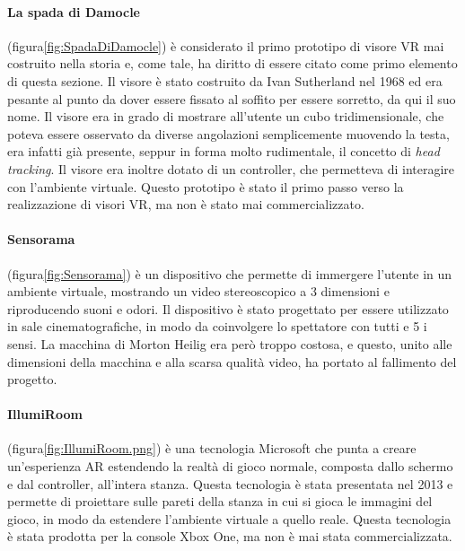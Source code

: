         \paragraph{La spada di Damocle} (figura\ref{fig:SpadaDiDamocle}) è considerato  il primo prototipo di visore VR mai costruito nella storia e, come tale, ha diritto di essere
            citato come primo elemento di questa sezione. Il visore è stato costruito da Ivan Sutherland nel 1968 ed era pesante al punto da dover essere fissato al soffito per
            essere sorretto, da qui il suo nome. Il visore era in grado di mostrare all'utente un cubo tridimensionale, che poteva essere osservato da diverse angolazioni 
            semplicemente muovendo la testa, era infatti già presente, seppur in forma molto rudimentale, il concetto di \textit{head tracking}. Il visore era inoltre dotato di un 
            controller, che permetteva di interagire con l'ambiente virtuale. Questo prototipo è stato il primo passo verso la realizzazione di visori VR, ma non è stato
            mai commercializzato.

        \paragraph{Sensorama} (figura\ref{fig:Sensorama}) è un dispositivo che permette di immergere l'utente in un
            ambiente virtuale, mostrando un video stereoscopico a 3 dimensioni e riproducendo suoni e odori. Il dispositivo è stato
            progettato per essere utilizzato in sale cinematografiche, in modo da coinvolgere lo spettatore con tutti e 5 i sensi.
            La macchina di Morton Heilig era però troppo costosa, e questo, unito alle dimensioni della macchina e alla scarsa qualità
            video, ha portato al fallimento del progetto.

        \paragraph{IllumiRoom} (figura\ref{fig:IllumiRoom.png}) è una tecnologia Microsoft che punta a creare un'esperienza AR estendendo la realtà di gioco
            normale, composta dallo schermo e dal controller, all'intera stanza. Questa tecnologia è stata presentata nel 2013
            e permette di proiettare sulle pareti della stanza in cui si gioca le immagini del gioco, in modo da estendere
            l'ambiente virtuale a quello reale. Questa tecnologia è stata prodotta per la console Xbox One, ma non è mai
            stata commercializzata.\cite{Schmalstieg2016}
        
